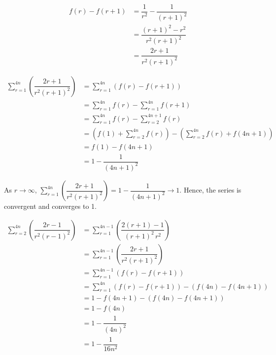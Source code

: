 \documentclass{jhwhw}
\begin{document}
    \solution
        \begin{align*}
            f(r) - f(r+1) &= \dfrac1{r^2} - \dfrac1{(r+1)^2}\\
            &= \dfrac{(r+1)^2 - r^2}{r^2(r+1)^2}\\
            &= \dfrac{2r+1}{r^2(r+1)^2}
        \end{align*}


        \begin{align*}
            \sum\limits_{r=1}^{4n} \left(\dfrac{2r+1}{r^2(r+1)^2}\right) &= \sum\limits_{r=1}^{4n} (f(r) - f(r+1))\\
            &= \sum\limits_{r=1}^{4n} f(r) - \sum\limits_{r=1}^{4n} f(r+1)\\
            &= \sum\limits_{r=1}^{4n} f(r) - \sum\limits_{r=2}^{4n+1} f(r)\\
            &= \left(f(1) + \sum\limits_{r=2}^{4n} f(r)\right) - \left(\sum\limits_{r=2}^{4n} f(r) + f(4n+1)\right)\\
            &= f(1) - f(4n+1)\\
            &= 1 - \dfrac{1}{(4n+1)^2}
        \end{align*}

        As $r \rightarrow \infty$, $ \sum\limits_{r=1}^{4n} \left(\dfrac{2r+1}{r^2(r+1)^2}\right) = 1 - \dfrac{1}{(4n+1)^2} \rightarrow 1$. Hence, the series is convergent and converges to 1.


        \begin{align*}
            \sum\limits_{r=2}^{4n} \left(\dfrac{2r-1}{r^2(r-1)^2}\right) &= \sum\limits_{r=1}^{4n-1} \left(\dfrac{2(r+1)-1}{(r+1)^2 \, r^2}\right)\\
            &= \sum\limits_{r=1}^{4n-1} \left(\dfrac{2r+1}{r^2(r+1)^2}\right)\\
            &= \sum\limits_{r=1}^{4n-1} (f(r) - f(r+1))\\
            &= \sum\limits_{r=1}^{4n} (f(r) - f(r+1)) - (f(4n) - f(4n+1))\\
            &= 1 - f(4n+1) - (f(4n) - f(4n+1))\\
            &= 1 - f(4n)\\
            &= 1 - \dfrac1{(4n)^2}\\
            &= 1 - \dfrac1{16n^2}
        \end{align*}
\end{document}
